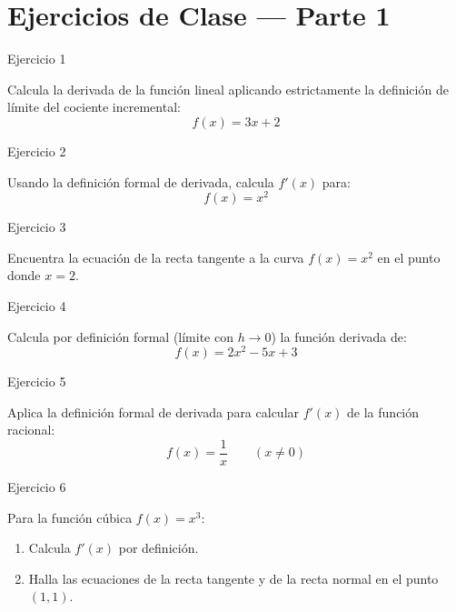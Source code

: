 \documentclass[aspectratio=169]{beamer}
\begin{document}
\section{Ejercicios de Clase — Parte 1}

\begin{frame}{Ejercicio 1}
  \begin{mwejercicio}
    Calcula la derivada de la función lineal aplicando estrictamente la definición de límite del cociente incremental:
    $$f(x) = 3x + 2$$
  \end{mwejercicio}
  \vspace{3.5cm}
\end{frame}
\begin{frame}{Ejercicio 2}
  \begin{mwejercicio}
    Usando la definición formal de derivada, calcula $f'(x)$ para:
    $$f(x) = x^2$$
  \end{mwejercicio}
  \vspace{3.5cm}
\end{frame}
\begin{frame}{Ejercicio 3}
  \begin{mwejercicio}
    Encuentra la ecuación de la recta tangente a la curva $f(x) = x^2$ en el punto donde $x = 2$.
  \end{mwejercicio}
  \vspace{3.5cm}
\end{frame}
\begin{frame}{Ejercicio 4}
  \begin{mwejercicio}
    Calcula por definición formal (límite con $h \to 0$) la función derivada de:
    $$f(x) = 2x^2 - 5x + 3$$
  \end{mwejercicio}
  \vspace{3.5cm}
\end{frame}
\begin{frame}{Ejercicio 5}
  \begin{mwejercicio}
    Aplica la definición formal de derivada para calcular $f'(x)$ de la función racional:
    $$f(x) = \frac{1}{x} \qquad (x \neq 0)$$
  \end{mwejercicio}
  \vspace{3.5cm}
\end{frame}
\begin{frame}{Ejercicio 6}
  \begin{mwejercicio}
    Para la función cúbica $f(x) = x^3$:
    \begin{enumerate}
      \item Calcula $f'(x)$ por definición.
      \item Halla las ecuaciones de la recta tangente y de la recta normal en el punto $(1, 1)$.
    \end{enumerate}
  \end{mwejercicio}
  \vspace{3.5cm}
\end{frame}
\end{document}
